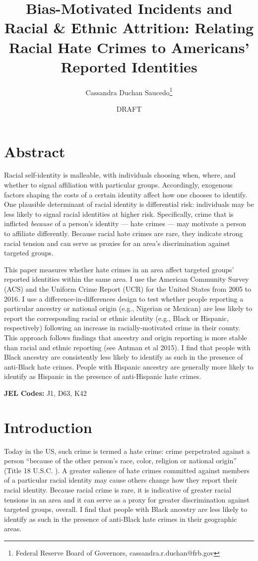 \documentclass{article}
\author[1]{Cassandra Duchan Saucedo\thanks{Federal Reserve Board of Governors, cassandra.r.duchan@frb.gov}}
\title{Bias-Motivated Incidents and Racial \& Ethnic Attrition: Relating Racial Hate Crimes to Americans' Reported Identities}
\date{DRAFT}
\begin{document}
\doublespacing
\maketitle

\section*{Abstract}

    Racial self-identity is malleable, with individuals choosing when, where, and whether to signal affiliation with particular groups. Accordingly, exogenous factors shaping the costs of a certain identity affect how one chooses to identify. One plausible determinant of racial identity is differential risk: individuals may be less likely to signal racial identities at higher risk. Specifically, crime that is inflicted \emph{because} of a person's identity --- hate crimes --- may motivate a person to affiliate differently. Because racial hate crimes are rare, they indicate strong racial tension and can serve as proxies for an area's discrimination against targeted groups. 
    
    This paper measures whether hate crimes in an area affect targeted groups' reported identities within the same area. I use the American Community Survey (ACS) and the Uniform Crime Report (UCR) for the United States from 2005 to 2016. I use a difference-in-differences design to test whether people reporting a particular ancestry or national origin (e.g., Nigerian or Mexican) are less likely to report the corresponding racial or ethnic identity (e.g., Black or Hispanic, respectively) following an increase in racially-motivated crime in their county. This approach follows findings that ancestry and origin reporting is more stable than racial and ethnic reporting (see Antman et al 2015). I find that people with Black ancestry are consistently less likely to identify as such in the presence of anti-Black hate crimes. People with Hispanic ancestry are generally more likely to identify as Hispanic in the presence of anti-Hispanic hate crimes.  
    
    \textbf{JEL Codes:} J1, D63, K42

\newpage


\section{Introduction}

    Today in the US, such crime is termed a hate crime: crime perpetrated against a person ``because of the other person's race, color, religion or national origin'' (Title 18 U.S.C. ). A greater salience of hate crimes committed against members of a particular racial identity may cause others change how they report their racial identity. Because racial crime is rare, it is indicative of greater racial tensions in an area and it can serve as a proxy for greater discrimination against targeted groups, overall. I find that people with Black ancestry are less likely to identify as such in the presence of anti-Black hate crimes in their geographic areas. 
    
\end{document}
